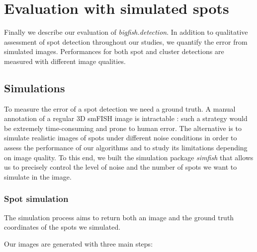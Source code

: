 
\section{Evaluation with simulated spots}
\label{sec:detection_evaluation}

Finally we describe our evaluation of \emph{bigfish.detection}.
In addition to qualitative assessment of spot detection throughout our studies, we quantify the error from simulated images.
Performances for both spot and cluster detections are measured with different image qualities.

\subsection{Simulations}
\label{subsec:simulation}

To measure the error of a spot detection we need a ground truth.
A manual annotation of a regular 3D \ac{smFISH} image is intractable : such a strategy would be extremely time-consuming and prone to human error.
The alternative is to simulate realistic images of spots under different noise conditions in order to assess the performance of our algorithms and to study its limitations depending on image quality.
To this end, we built the simulation package \emph{simfish} that allows us to precisely control the level of noise and the number of spots we want to simulate in the image.

\subsubsection{Spot simulation}

The simulation process aims to return both an image and the ground truth coordinates of the spots we simulated.

\noindent
Our images are generated with three main steps:

